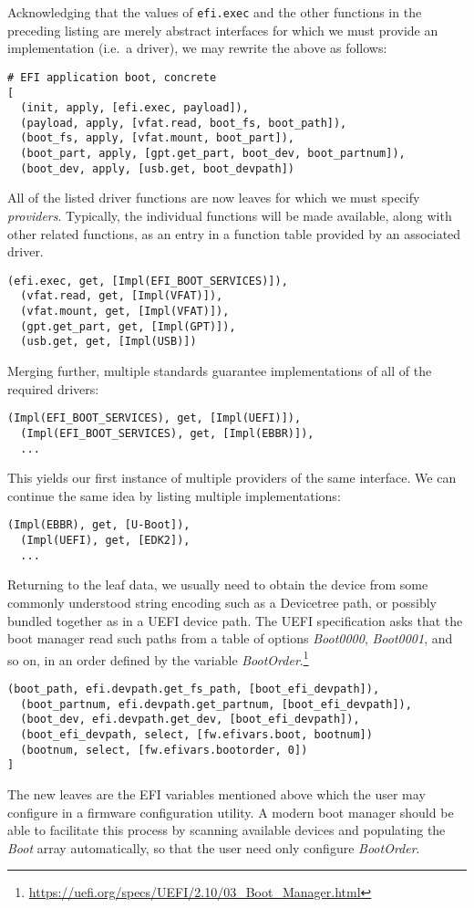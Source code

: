 Acknowledging that the values of \texttt{efi.exec} and the other functions in the preceding listing are merely abstract interfaces for which we must provide an implementation (i.e.~a driver), we may rewrite the above as follows:
%
\begin{lstlisting}[name=efi]
# EFI application boot, concrete
[
  (init, apply, [efi.exec, payload]),
  (payload, apply, [vfat.read, boot_fs, boot_path]),
  (boot_fs, apply, [vfat.mount, boot_part]),
  (boot_part, apply, [gpt.get_part, boot_dev, boot_partnum]),
  (boot_dev, apply, [usb.get, boot_devpath])
\end{lstlisting}
%
All of the listed driver functions are now leaves for which we must specify \emph{providers}.
%
Typically, the individual functions will be made available, along with other related functions, as an entry in a function table provided by an associated driver.
%
\begin{lstlisting}[name=efi]
  (efi.exec, get, [Impl(EFI_BOOT_SERVICES)]),
  (vfat.read, get, [Impl(VFAT)]),
  (vfat.mount, get, [Impl(VFAT)]),
  (gpt.get_part, get, [Impl(GPT)]),
  (usb.get, get, [Impl(USB)])
\end{lstlisting}
%
Merging further, multiple standards guarantee implementations of all of the required drivers:
%
\begin{lstlisting}[name=efi]
  (Impl(EFI_BOOT_SERVICES), get, [Impl(UEFI)]),
  (Impl(EFI_BOOT_SERVICES), get, [Impl(EBBR)]),
  ...
\end{lstlisting}
%
This yields our first instance of multiple providers of the same interface.
%
We can continue the same idea by listing multiple implementations:
%
\begin{lstlisting}[firstnumber=22]
  (Impl(EBBR), get, [U-Boot]),
  (Impl(UEFI), get, [EDK2]),
  ...
\end{lstlisting}

Returning to the leaf data, we usually need to obtain the device from some commonly understood string encoding such as a Devicetree path, or possibly bundled together as in a UEFI device path.%
%
The UEFI specification asks that the boot manager read such paths from a table of options \emph{Boot0000}, \emph{Boot0001}, and so on, in an order defined by the variable \emph{BootOrder}.\footnote{\url{https://uefi.org/specs/UEFI/2.10/03_Boot_Manager.html}}
%
\begin{lstlisting}[firstnumber=30]
  (boot_path, efi.devpath.get_fs_path, [boot_efi_devpath]),
  (boot_partnum, efi.devpath.get_partnum, [boot_efi_devpath]),
  (boot_dev, efi.devpath.get_dev, [boot_efi_devpath]),
  (boot_efi_devpath, select, [fw.efivars.boot, bootnum])
  (bootnum, select, [fw.efivars.bootorder, 0])
]
\end{lstlisting}
%
The new leaves are the EFI variables mentioned above which the user may configure in a firmware configuration utility.
%
A modern boot manager should be able to facilitate this process by scanning available devices and populating the \emph{Boot} array automatically, so that the user need only configure \emph{BootOrder}.


